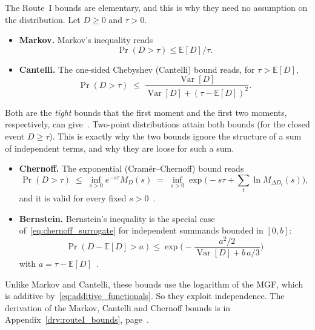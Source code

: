 \documentclass[11pt,a4paper]{article}
\theoremstyle{plain}
\theoremstyle{definition}
\theoremstyle{remark}
\begin{document}
The Route~I bounds are elementary, and this is why they need no assumption on the distribution.
Let $D \ge 0$ and $\tau > 0$.
\begin{itemize}
  \item \textbf{Markov.} Markov's inequality reads
    \begin{equation}\label{eq:markov_surrogate}
      \Pr(D > \tau) \le \mathbb{E}[D]/\tau.
    \end{equation}
  \item \textbf{Cantelli.} The one-sided Chebyshev (Cantelli) bound reads, for $\tau > \mathbb{E}[D]$,
    \begin{equation}\label{eq:cantelli_surrogate}
      \Pr(D > \tau) \;\le\; \frac{\operatorname{Var}[D]}{\operatorname{Var}[D] + (\tau - \mathbb{E}[D])^2}.
    \end{equation}
\end{itemize}
Both are the \emph{tight} bounds that the first moment and the first two moments, respectively, can give~\cite{BertsimasPopescu2005}.
Two-point distributions attain both bounds (for the closed event $D \ge \tau$).
This is exactly why the two bounds ignore the structure of a sum of independent terms, and why they are loose for such a sum.

\begin{itemize}
  \item \textbf{Chernoff.} The exponential (Cram\'er--Chernoff) bound reads
    \begin{equation}\label{eq:chernoff_surrogate}
      \Pr(D > \tau) \;\le\; \inf_{s > 0} e^{-s\tau} M_D(s)
      \;=\; \inf_{s > 0} \exp\!\Big( -s\tau + \textstyle\sum_t \ln M_{\Delta D_t}(s) \Big),
    \end{equation}
    and it is valid for every fixed $s > 0$~\cite{Chernoff1952}.
  \item \textbf{Bernstein.} Bernstein's inequality is the special case of~\eqref{eq:chernoff_surrogate} for independent summands bounded in $[0,b]$:
    \begin{equation}
      \Pr(D - \mathbb{E}[D] > a) \le \exp\Big( -\frac{a^2/2}{\operatorname{Var}[D] + b\,a/3} \Big)
    \end{equation}
    with $a = \tau - \mathbb{E}[D]$~\cite{BoucheronLugosiMassart2013}.
\end{itemize}
Unlike Markov and Cantelli, these bounds use the logarithm of the MGF, which is additive by~\eqref{eq:additive_functionals}.
So they exploit independence.
The derivation of the Markov, Cantelli and Chernoff bounds is in Appendix~\ref{drv:routeI_bounds}, page~\pageref{drv:routeI_bounds}.
\end{document}
